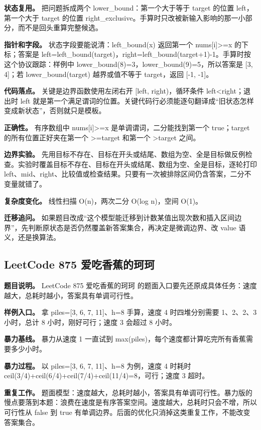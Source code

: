 \textbf{状态复用。} 把问题拆成两个 lower\_bound：第一个大于等于 target 的位置 left，第一个大于 target 的位置 right\_exclusive。手算时只改被新输入影响的那一小部分，而不是回头重算完整候选。

\textbf{指针和字段。} 状态字段要能说清：left\_bound(x) 返回第一个 nums[i]>=x 的下标；答案是 left=left\_bound(target)，right=left\_bound(target+1)-1。手算时按这个协议跟踪：样例中 lower\_bound(8)=3，lower\_bound(9)=5，所以答案是 [3, 4]；若 lower\_bound(target) 越界或值不等于 target，返回 [-1, -1]。

\textbf{代码落点。} 关键是边界函数使用左闭右开 [left, right)，循环条件 left<right；退出时 left 就是第一个满足谓词的位置。关键代码行必须能逐句翻译成“旧状态怎样变成新状态”，否则就只是模板。

\textbf{正确性。} 有序数组中 nums[i]>=x 是单调谓词，二分能找到第一个 true；target 的所有位置正好夹在第一个 >=target 和第一个 >target 之间。

\textbf{边界实验。} 先用目标不存在、目标在开头或结尾、数组为空、全是目标做反例检查。实验时覆盖目标不存在、目标在开头或结尾、数组为空、全是目标，逐轮打印 left、mid、right、比较值或检查结果。只要有一次被排除区间仍含答案，二分不变量就错了。

\textbf{复杂度变化。} 线性扫描 O(n)，两次二分 O(log n)，空间 O(1)。

\textbf{迁移追问。} 如果题目改成“这个模型能迁移到计数某值出现次数和插入区间边界”，先判断原状态是否仍然覆盖新答案集合，再决定是微调边界、改 value 语义，还是换算法。

\subsection{LeetCode 875 爱吃香蕉的珂珂}

\textbf{题目说明。} LeetCode 875 爱吃香蕉的珂珂 的题面入口要先还原成具体任务：速度越大，总耗时越小，答案具有单调可行性。

\textbf{样例入口。} 拿 piles=[3, 6, 7, 11]、h=8 手算，速度 4 时四堆分别需要 1、2、2、3 小时，总计 8 小时，刚好可行；速度 3 会超过 8 小时。

\textbf{暴力基线。} 暴力从速度 1 一直试到 max(piles)，每个速度都计算吃完所有香蕉需要多少小时。

\textbf{暴力过程。} 以 piles=[3, 6, 7, 11]、h=8 为例，速度 4 时耗时 ceil(3/4)+ceil(6/4)+ceil(7/4)+ceil(11/4)=8，可行；速度 3 超时。

\textbf{重复工作。} 题面模型：速度越大，总耗时越小，答案具有单调可行性。暴力版的慢点要落到本题：浪费在速度是有序答案空间。速度越大，总耗时只会不增，所以可行性从 false 到 true 有单调边界。后面的优化只消掉这类重复工作，不能改变答案集合。

